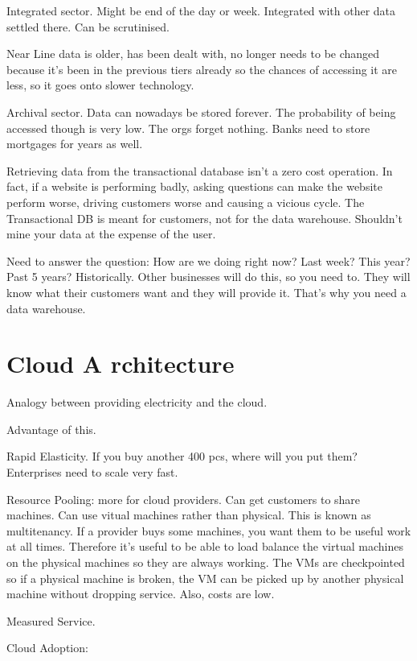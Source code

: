 \documentclass[11pt]{article}
\begin{document}
Integrated sector. Might be end of the day or week. Integrated with other data settled there. Can be scrutinised.

Near Line data is older, has been dealt with, no longer needs to be changed because it’s been in the previous tiers already so the chances of accessing it are less, so it goes onto slower technology.

Archival sector. Data can nowadays be stored forever. The probability of being accessed though is very low. The orgs forget nothing. Banks need to store mortgages for years as well.

Retrieving data from the transactional database isn’t a zero cost operation. In fact, if a website is performing badly, asking questions can make the website perform worse, driving customers worse and causing a vicious cycle. The Transactional DB is meant for customers, not for the data warehouse. Shouldn’t mine your data at the expense of the user.

Need to answer the question: How are we doing right now? Last week? This year? Past 5 years? Historically. Other businesses will do this, so you need to. They will know what their customers want and they will provide it. That’s why you need a data warehouse.


\section{Cloud A rchitecture}

Analogy between providing electricity and the cloud.

Advantage of this.

Rapid Elasticity. If you buy another 400 pcs, where will you put them? Enterprises need to scale very fast.

Resource Pooling: more for cloud providers. Can get customers to share machines. Can use vitual machines rather than physical. This is known as multitenancy. If a provider buys some machines, you want them to be useful work at all times. Therefore it’s useful to be able to load balance the virtual machines on the physical machines so they are always working. The VMs are checkpointed so if a physical machine is broken, the VM can be picked up by another physical machine without dropping service. Also, costs are low.

Measured Service.

Cloud Adoption:
\end{document}
